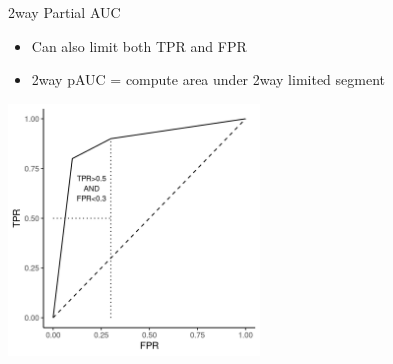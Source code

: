 \begin{vbframe}{2way Partial AUC}

\begin{itemize}
\item Can also limit both TPR and FPR 
\item 2way pAUC = compute area under 2way limited segment
\end{itemize}
\begin{center}
\includegraphics[width=0.5\textwidth]{figure/fig_pauc_2way}
\end{center}
\end{vbframe}




